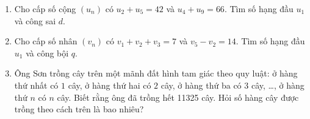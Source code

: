 \begin{ex}%
	\begin{enumerate}
		\item  Cho cấp số cộng $(u_n )$ có $u_2+u_5=42$ và $u_4+u_9=66$. Tìm số hạng đầu $u_1$ và công sai $d$.
		\item  Cho cấp số nhân $(v_n )$ có $v_1+v_2+v_3=7$ và $v_5-v_2=14$. Tìm số hạng đầu $u_1$ và công bội $q$.
		\item  Ông Sơn trồng cây trên một mãnh đất hình tam giác theo quy luật: ở hàng thứ nhất có $1$ cây, ở hàng thứ hai có $2$ cây, ở hàng thứ ba có $3$ cây, {\dots}, ở hàng thứ $n$ có $n$ cây. Biết rằng ông đã trồng hết 11325 cây. Hỏi số hàng cây được trồng theo cách trên là bao nhiêu?
	\end{enumerate}
\end{ex}
